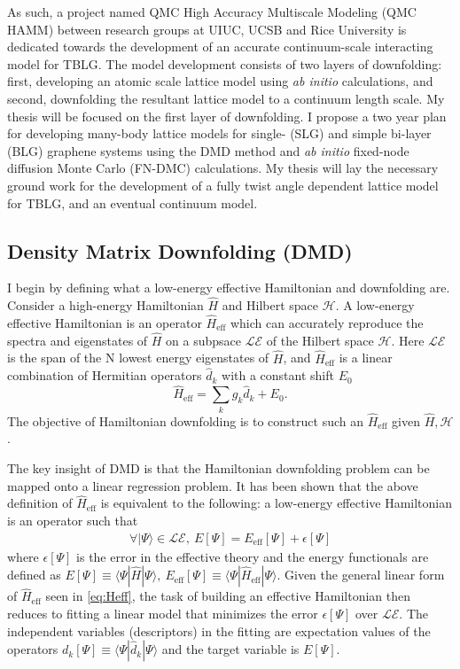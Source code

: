 \documentclass[12pt]{article}
\begin{document}
As such, a project named QMC High Accuracy Multiscale Modeling (QMC HAMM) between research groups at UIUC, UCSB and Rice University is dedicated towards the development of an accurate continuum-scale interacting model for TBLG.
The model development consists of two layers of downfolding: first, developing an atomic scale lattice model using \textit{ab initio} calculations, and second, downfolding the resultant lattice model to a continuum length scale.
My thesis will be focused on the first layer of downfolding.
I propose a two year plan for developing many-body lattice models for single- (SLG) and simple bi-layer (BLG) graphene systems using the DMD method and \textit{ab initio} fixed-node diffusion Monte Carlo (FN-DMC) calculations.
My thesis will lay the necessary ground work for the development of a fully twist angle dependent lattice model for TBLG, and an eventual continuum model.

\subsection{Density Matrix Downfolding (DMD)}
I begin by defining what a low-energy effective Hamiltonian and downfolding are.
Consider a high-energy Hamiltonian $\hat{H}$ and Hilbert space $\mathcal{H}$.
A low-energy effective Hamiltonian is an operator $\hat{H}_\text{eff}$ which can accurately reproduce the spectra and eigenstates of $\hat{H}$ on a subpsace $\mathcal{LE}$ of the Hilbert space $\mathcal{H}$.
Here $\mathcal{LE}$ is the span of the N lowest energy eigenstates of $\hat{H}$, and $\hat{H}_\text{eff}$ is a linear combination of Hermitian operators $\hat{d}_k$ with a constant shift $E_0$
\begin{equation}
\hat{H}_\text{eff} = \sum_{k} g_k \hat{d}_k  + E_0.
\label{eq:Heff}
\end{equation}
The objective of Hamiltonian downfolding is to construct such an $\hat{H}_\text{eff}$ given $\hat{H}, \mathcal{H}$.

The key insight of DMD is that the Hamiltonian downfolding problem can be mapped onto a linear regression problem.
It has been shown \cite{Zheng2017} that the above definition of $\hat{H}_\text{eff}$ is equivalent to the following: a low-energy effective Hamiltonian is an operator such that 
\begin{equation}
\begin{split}
\forall |\Psi\rangle \in \mathcal{LE},\ E[\Psi] = E_\text{eff}[\Psi]  + \epsilon[\Psi]
\end{split}
\label{eq:DMD}
\end{equation}
where $\epsilon[\Psi]$ is the error in the effective theory and the energy functionals are defined as $E[\Psi] \equiv \langle \Psi | \hat{H} |\Psi \rangle,\  E_\text{eff}[\Psi] \equiv \langle \Psi | \hat{H}_\text{eff} |\Psi \rangle$.
Given the general linear form of $\hat{H}_\text{eff}$ seen in \eqref{eq:Heff}, 
the task of building an effective Hamiltonian then reduces to fitting a linear model that minimizes the error $\epsilon[\Psi]$ over $\mathcal{LE}$.
The independent variables (descriptors) in the fitting are expectation values of the operators $d_k[\Psi] \equiv \langle \Psi |\hat{d}_k|\Psi \rangle$ and the target variable is $E[\Psi]$.
\end{document}
